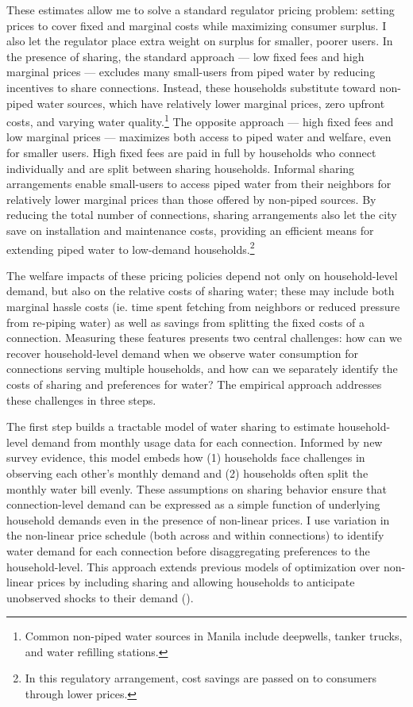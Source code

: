 \documentclass[12pt]{article}
\begin{document}
These estimates allow me to solve a standard regulator pricing problem: setting prices to cover fixed and marginal costs while maximizing consumer surplus.  I also let the regulator place extra weight on surplus for smaller, poorer users.  In the presence of sharing, the standard approach --- low fixed fees and high marginal prices --- excludes many small-users from piped water by reducing incentives to share connections.  Instead, these households substitute toward non-piped water sources, which have relatively lower marginal prices, zero upfront costs, and varying water quality.\footnote{Common non-piped water sources in Manila include deepwells, tanker trucks, and water refilling stations.}  The opposite approach --- high fixed fees and low marginal prices --- maximizes both access to piped water and welfare, even for smaller users.  High fixed fees are paid in full by households who connect individually and are split between sharing households.  Informal sharing arrangements enable small-users to access piped water from their neighbors for relatively lower marginal prices than those offered by non-piped sources.  By reducing the total number of connections, sharing arrangements also let the city save on installation and maintenance costs, providing an efficient means for extending piped water to low-demand households.\footnote{In this regulatory arrangement, cost savings are passed on to consumers through lower prices.}  

The welfare impacts of these pricing policies depend not only on household-level demand, but also on the relative costs of sharing water; these may include both marginal hassle costs (ie. time spent fetching from neighbors or reduced pressure from re-piping water) as well as savings from splitting the fixed costs of a connection.  Measuring these features presents two central challenges: how can we recover household-level demand when we observe water consumption for connections serving multiple households, and how can we separately identify the costs of sharing and preferences for water?  The empirical approach addresses these challenges in three steps. 

The first step builds a tractable model of water sharing to estimate household-level demand from monthly usage data for each connection.  Informed by new survey evidence, this model embeds how (1) households face challenges in observing each other's monthly demand and (2) households often split the monthly water bill evenly.  These assumptions on sharing behavior ensure that connection-level demand can be expressed as a simple function of underlying household demands even in the presence of non-linear prices.  I use variation in the non-linear price schedule (both across and within connections) to identify water demand for each connection before disaggregating preferences to the household-level.  This approach extends previous models of optimization over non-linear prices by including sharing and allowing households to anticipate unobserved shocks to their demand (\cite{moffitt1986econometrics,burtless1978effect}).
\end{document}
